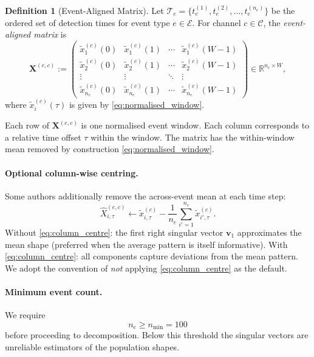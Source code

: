 \documentclass[11pt,a4paper]{article}
\theoremstyle{definition}
\newtheorem{definition}{Definition}[section]
\theoremstyle{plain}
\newcommand{\R}{\mathbb{R}}
\newcommand{\Xmat}{\mathbf{X}}
\newcommand{\bvec}[1]{\mathbf{#1}}
\begin{document}
\begin{definition}[Event-Aligned Matrix]
\label{def:event_matrix}
Let $\mathcal{T}_e = \{t_e^{(1)}, t_e^{(2)}, \ldots, t_e^{(n_e)}\}$ be the ordered
set of detection times for event type $e \in \mathcal{E}$. For channel $c \in
\mathcal{C}$, the \emph{event-aligned matrix} is
\begin{equation}
    \Xmat^{(e,c)} :=
    \begin{pmatrix}
        \tilde{x}^{(c)}_1(0) & \tilde{x}^{(c)}_1(1) & \cdots & \tilde{x}^{(c)}_1(W-1) \\
        \tilde{x}^{(c)}_2(0) & \tilde{x}^{(c)}_2(1) & \cdots & \tilde{x}^{(c)}_2(W-1) \\
        \vdots & \vdots & \ddots & \vdots \\
        \tilde{x}^{(c)}_{n_e}(0) & \tilde{x}^{(c)}_{n_e}(1) & \cdots &
        \tilde{x}^{(c)}_{n_e}(W-1)
    \end{pmatrix}
    \in \R^{n_e \times W},
    \label{eq:event_matrix}
\end{equation}
where $\tilde{x}^{(c)}_i(\tau)$ is given by \eqref{eq:normalised_window}.
\end{definition}

Each row of $\Xmat^{(e,c)}$ is one normalised event window. Each column corresponds to a
relative time offset $\tau$ within the window. The matrix has the within-window mean
removed by construction \eqref{eq:normalised_window}.

\paragraph{Optional column-wise centring.}
Some authors additionally remove the across-event mean at each time step:
\begin{equation}
    \hat{X}^{(e,c)}_{i,\tau} \leftarrow
    \tilde{x}^{(c)}_{i,\tau} -
    \frac{1}{n_e} \sum_{i'=1}^{n_e} \tilde{x}^{(c)}_{i',\tau}.
    \label{eq:column_centre}
\end{equation}
Without \eqref{eq:column_centre}: the first right singular vector $\bvec{v}_1$
approximates the mean shape (preferred when the average pattern is itself informative).
With \eqref{eq:column_centre}: all components capture deviations from the mean pattern.
We adopt the convention of \emph{not} applying \eqref{eq:column_centre} as the default.

\paragraph{Minimum event count.}
We require
\begin{equation}
    n_e \geq n_{\min} = 100
    \label{eq:min_events}
\end{equation}
before proceeding to decomposition. Below this threshold the singular vectors are
unreliable estimators of the population shapes.
\end{document}
